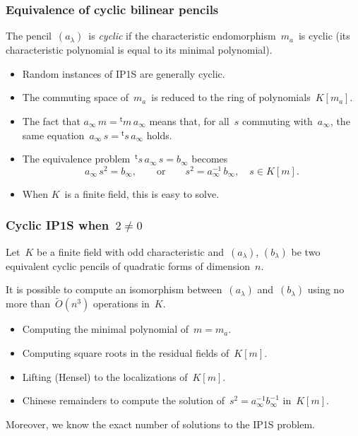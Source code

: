 \documentclass{beamer}%
\def\transpose{{}^{\mathrm{\scriptscriptstyle t}}\!}
\let\mathrm\mathsf
\begin{document}
\begin{frame}\frametitle{Equivalence of cyclic bilinear pencils}%
The pencil~$(a_{λ})$~is \emph{cyclic} if the characteristic
endomorphism~$m_{a}$~is cyclic (its characteristic polynomial is equal to
its minimal polynomial).
\begin{itemize}
\item Random instances of IP1S are generally cyclic.
\item The commuting space of~$m_{a}$~is reduced to the ring of
polynomials~$K[m_a]$.
\item The fact that $a_{∞}\, m = \transpose{m}\, a_{∞}$ means that, for
all~$s$ commuting with~$a_{∞}$, the same equation~$a_{∞}\, s =
\transpose{s}\, a_{∞}$ holds.
\item The equivalence problem~$\transpose{s}\, a_{∞}\, s = b_{∞}$ becomes
\begin{equation*}
a_{∞}\, s^2 = b_{∞}, \qquad \text{or}\qquad s^2 = a_{∞}^{-1}\, b_{∞},
\quad s ∈ K[m].
\end{equation*}
\item When $K$~is a finite field, this is easy to solve.
\end{itemize}
\end{frame}%
\begin{frame}\frametitle{Cyclic IP1S when~$2 ≠ 0$}%
\begin{theorem}
Let~$K$ be a finite field with odd characteristic and~$(a_{λ})$,
$(b_{λ})$ be two equivalent cyclic pencils of quadratic forms of
dimension~$n$.

It is possible to compute an isomorphism between~$(a_{λ})$ and~$(b_{λ})$
using no more than~$\widetilde O(n^3)$ operations in~$K$.
\end{theorem}
\begin{itemize}
\item Computing the minimal polynomial of~$m = m_a$.
\item Computing square roots in the residual fields of~$K[m]$.
\item Lifting (Hensel) to the localizations of~$K[m]$.
\item Chinese remainders to compute the solution of~$s^2 = a_{∞}^{-1}
b_{∞}^{-1}$ in~$K[m]$.
\end{itemize}
Moreover, we know the exact number of solutions to the IP1S problem.
\end{frame}%
\end{document}
